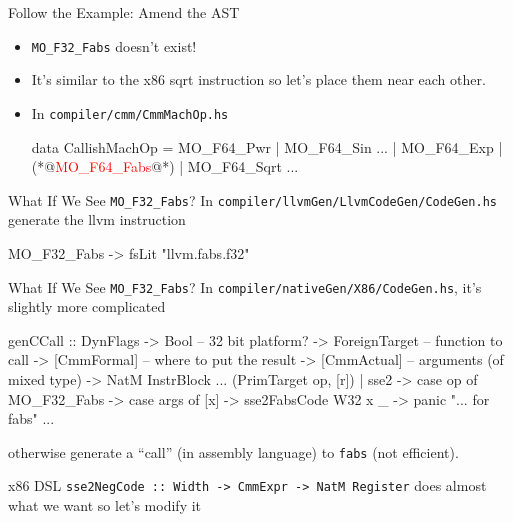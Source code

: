 \documentclass[presentation]{beamer}
\begin{document}
\begin{frame}[fragile]{Follow the Example: Amend the AST}

  \begin{itemize}
    \item \texttt{MO\_F32\_Fabs} doesn't exist!
    \item It's similar to the x86 sqrt instruction so let's place them near each other.
    \item In \texttt{compiler/cmm/CmmMachOp.hs}
      \begin{haskelL}
        data CallishMachOp
        = MO_F64_Pwr
        | MO_F64_Sin
        ...
        | MO_F64_Exp
        | (*@\textcolor{red}{MO\_F64\_Fabs}@*)
        | MO_F64_Sqrt
        ...
      \end{haskelL}
  \end{itemize}
\end{frame}

\begin{frame}[fragile]{What If We See \texttt{MO\_F32\_Fabs}?}
  In \texttt{compiler/llvmGen/LlvmCodeGen/CodeGen.hs} generate the llvm instruction
  \begin{haskelL}
    MO_F32_Fabs -> fsLit "llvm.fabs.f32"
  \end{haskelL}

\end{frame}

\begin{frame}[fragile]{What If We See \texttt{MO\_F32\_Fabs}?}
  In \texttt{compiler/nativeGen/X86/CodeGen.hs}, it's slightly more complicated
  \begin{haskelL}
  genCCall
    :: DynFlags
    -> Bool                     -- 32 bit platform?
    -> ForeignTarget            -- function to call
    -> [CmmFormal]        -- where to put the result
    -> [CmmActual]        -- arguments (of mixed type)
    -> NatM InstrBlock
    ...
    (PrimTarget op, [r])
      | sse2 -> case op of
          MO_F32_Fabs -> case args of
            [x] -> sse2FabsCode W32 x
            _ -> panic "... for fabs"
    ...
  \end{haskelL}
  otherwise generate a ``call'' (in assembly language) to
  \texttt{fabs} (not efficient).
\end{frame}


\begin{frame}[fragile]{x86 DSL}
  \texttt{sse2NegCode :: Width -> CmmExpr -> NatM Register} does almost what we want so let's modify it
\end{frame}
\end{document}
